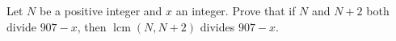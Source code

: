 Let $N$ be a positive integer and $x$ an integer. Prove that if $N$ and $N+2$ both divide $907-x$, then $\operatorname{lcm}(N,N+2)$ divides $907-x$.
